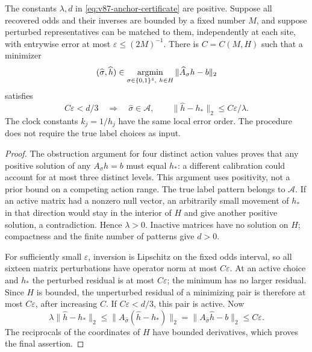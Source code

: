 \begin{proposition}
\label{prop:v87-anchor-certificate}
The constants $\lambda,d$ in \eqref{eq:v87-anchor-certificate} are
positive. Suppose all recovered odds and their inverses are bounded
by a fixed number $M$, and suppose perturbed representatives can be
matched to them, independently at each site, with entrywise error at
most $\varepsilon\le(2M)^{-1}$. There is $C=C(M,H)$ such that a minimizer
\[
 (\widehat\sigma,\widehat h)\in
       \mathop{\rm argmin}_{\sigma\in\{0,1\}^4,\ h\in H}
                                  \|\widehat A_\sigma h-b\|_2
\]
satisfies
\begin{equation}\label{eq:v87-anchor-bound}
 C\varepsilon<d/3\quad\Longrightarrow\quad
 \widehat\sigma\in\mathcal A,\qquad
                     \|\widehat h-h_*\|_2\le C\varepsilon/\lambda.
\end{equation}
The clock constants $k_j=1/h_j$ have the same local error order.
The procedure does not require the true label choices as input.
\end{proposition}
\begin{proof}
The obstruction argument for four distinct action values proves that
any positive solution of any $A_\sigma h=b$ must equal $h_*$:
a different calibration could account for at most three distinct
levels. This argument uses positivity, not a prior bound on a
competing action range. The true label pattern belongs to $\mathcal A$.
If an active matrix had a nonzero null vector, an arbitrarily small
movement of $h_*$ in that direction would stay in the interior of
$H$ and give another positive solution, a contradiction. Hence
$\lambda>0$. Inactive matrices have no solution on $H$; compactness
and the finite number of patterns give $d>0$.

For sufficiently small $\varepsilon$, inversion is Lipschitz on
the fixed odds interval, so all sixteen matrix perturbations have
operator norm at most $C\varepsilon$. At an active choice and $h_*$
the perturbed residual is at most $C\varepsilon$; the minimum has
no larger residual. Since $H$ is bounded, the unperturbed residual
of a minimizing pair is therefore at most $C\varepsilon$, after
increasing $C$. If $C\varepsilon<d/3$, this pair is active. Now
\[
 \lambda\|\widehat h-h_*\|_2
 \le\|A_{\widehat\sigma}(\widehat h-h_*)\|_2
 =\|A_{\widehat\sigma}\widehat h-b\|_2
 \le C\varepsilon.
\]
The reciprocals of the coordinates of $H$ have bounded derivatives,
which proves the final assertion.
\end{proof}
